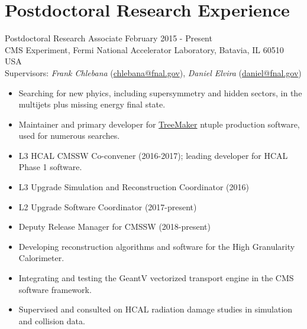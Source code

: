 \setlength{\parskip}{0pt}
\section{Postdoctoral Research Experience}
Postdoctoral Research Associate \hfill February 2015 - Present\\
CMS Experiment, Fermi National Accelerator Laboratory, Batavia, IL 60510 USA\\
Supervisors: {\sl Frank Chlebana} (\href{mailto:chlebana@fnal.gov}{chlebana@fnal.gov}), {\sl Daniel Elvira} (\href{mailto:daniel@fnal.gov}{daniel@fnal.gov})
\begin{itemize}[leftmargin=12pt]
\item Searching for new phyics, including supersymmetry and hidden sectors, in the multijets plus missing energy final state.
\item Maintainer and primary developer for \href{https://github.com/TreeMaker/TreeMaker}{TreeMaker} ntuple production software, used for numerous searches.
\item L3 HCAL CMSSW Co-convener (2016-2017); leading developer for HCAL Phase 1 software.
\item L3 Upgrade Simulation and Reconstruction Coordinator (2016)
\item L2 Upgrade Software Coordinator (2017-present)
\item Deputy Release Manager for CMSSW (2018-present)
\item Developing reconstruction algorithms and software for the High Granularity Calorimeter.
\item Integrating and testing the GeantV vectorized transport engine in the CMS software framework.
\item Supervised and consulted on HCAL radiation damage studies in simulation and collision data.
\end{itemize}
